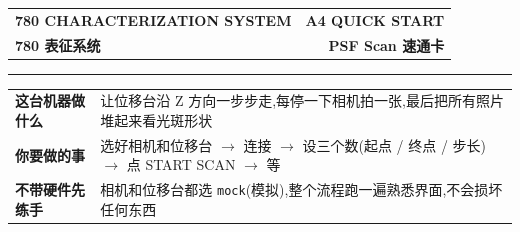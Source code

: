 \documentclass[a4paper,10pt]{ctexart}
\newcommand{\kicker}[1]{\textsf{\small\bfseries\color{inkMuted}#1}}
\newcommand{\key}[1]{\texttt{#1}}
\begin{document}
\begin{tabularx}{\linewidth}{@{}Xr@{}}
  {\kicker{780 CHARACTERIZATION SYSTEM}} & {\kicker{A4 QUICK START}} \\
  {\Huge\bfseries 780 表征系统} & {\Large\bfseries PSF Scan 速通卡} \\
\end{tabularx}
{\color{ruleFirm}\rule{\linewidth}{0.7pt}}

\vspace{0.35em}
\begin{tabularx}{\linewidth}{@{}>{\bfseries}lX@{}}
这台机器做什么 & 让位移台沿 Z 方向一步步走,每停一下相机拍一张,最后把所有照片堆起来看光斑形状\\
你要做的事 & 选好相机和位移台 \(\to\) 连接 \(\to\) 设三个数(起点 / 终点 / 步长) \(\to\) 点 START SCAN \(\to\) 等\\
不带硬件先练手 & 相机和位移台都选 \key{mock}(模拟),整个流程跑一遍熟悉界面,不会损坏任何东西\\
\end{tabularx}
\end{document}

